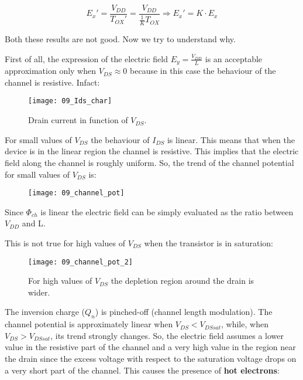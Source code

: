 \documentclass[a4paper, 12pt, twoside, openright]{report}
\begin{document}
{	\begin{equation}
	E_x' = \frac{V_{DD}}{T_{OX}'} = \frac{V_{DD}}{\frac{1}{K}T_{OX}} \Rightarrow E_x' = K \cdot E_x
	\label{}
	\end{equation}

Both these results are not good. Now we try to understand why.

First of all, the expression of the electric field $E_y = \frac{V_{DD}}{L}$ is an acceptable approximation only when $V_{DS} \approx 0$ because in this case the behaviour of the channel is resistive. Infact:

	\begin{figure}[H]
	\centering
	\texttt{[image: 09\_Ids\_char]}
	\caption{Drain current in function of $V_{DS}$.}
	\label{}
	\end{figure}

For small values of $V_{DS}$ the behaviour of $I_{DS}$ is linear. This means that when the device is in the linear region the channel is resistive. This implies that the electric field along the channel is roughly uniform. So, the trend of the channel potential for small values of $V_{DS}$ is:

	\begin{figure}[H]
	\centering
	\texttt{[image: 09\_channel\_pot]}
	\caption{}
	\label{}
	\end{figure}

Since $\Phi_{ch}$ is linear the electric field can be simply evaluated as the ratio between $V_{DD}$ and L.

This is not true for high values of $V_{DS}$ when the transistor is in saturation:

	\begin{figure}[H]
	\centering
	\texttt{[image: 09\_channel\_pot\_2]}
	\caption{For high values of $V_{DS}$ the depletion region around the drain is wider.}
	\label{}
	\end{figure}

The inversion charge ($Q_{n}$) is pinched-off (channel length modulation). The channel potential is approximately linear when $V_{DS} < V_{DSsat}$, while, when $V_{DS} > V_{DSsat}$, its trend strongly changes. So, the electric field assumes a lower value in the resistive part of the channel and a very high value in the region near the drain since the excess voltage with respect to the saturation voltage drops on a very short part of the channel. This causes the presence of \textbf{hot electrons}:

\newpage

}
\end{document}
